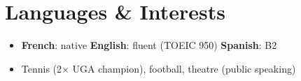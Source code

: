\documentclass[a4paper,10.5pt]{extarticle}
\begin{document}
\section{Languages \& Interests}
\begin{itemize}[leftmargin=0.08in, label={}]
  \item \textbf{French}: native \quad \textbf{English}: fluent (TOEIC 950) \quad \textbf{Spanish}: B2
  \item Tennis (2$\times$ UGA champion), football, theatre (public speaking)
\end{itemize}
\end{document}
